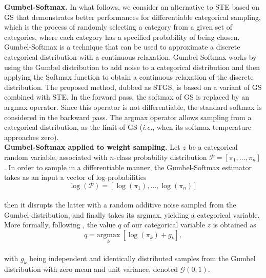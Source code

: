 \noindent\textbf{Gumbel-Softmax.} In what follows, we consider an alternative to
\ac{STE} based on \acf{GS} \cite{DBLP:conf/iclr/JangGP17} that demonstrates
better performances for differentiable categorical sampling, which is the
process of randomly selecting a category from a given set of categories, where
each category has a specified probability of being chosen. Gumbel-Softmax is a
technique that can be used to approximate a discrete categorical distribution
with a continuous relaxation. Gumbel-Softmax works by using the Gumbel
distribution \cite{gumbel1935valeurs} to add noise to a categorical distribution
and then applying the Softmax function to obtain a continuous relaxation of the
discrete distribution. The proposed method, dubbed as \acf{STGS}, is based on a
variant of \acl{GS} combined with \acl{STE}. In the forward pass, the softmax of
\ac{GS} is replaced by an argmax operator. Since this operator is not
differentiable, the standard softmax is considered in the backward pass. The
argmax operator allows sampling from a categorical distribution, as the limit of
\ac{GS} (\emph{i.e.}, when its softmax temperature approaches zero). \\

\noindent \textbf{Gumbel-Softmax applied to weight sampling.} Let $z$ be a
categorical random variable, associated with $n$-class probability distribution
$\mathcal{P} = [\pi_1,\dots,\pi_n]$. In order to sample in a differentiable
manner, the Gumbel-Softmax estimator takes as an input a vector of
log-probabilities \\

\begin{equation}
  \label{eqn:chap2:gumbel-softmax-input}
  \log(\mathcal{P}) =[\log(\pi_1),\dots, \log(\pi_n)]
\end{equation}\\

then it disrupts the latter with a random additive noise sampled from the Gumbel
distribution, and finally takes its argmax, yielding a categorical
variable. More formally, following \cite{DBLP:conf/iclr/JangGP17}, the value $q$
of our categorical variable $z$ is obtained as \\

\begin{equation}
  \label{eqn:chap2:gumbel-softmax-argmax}
  q = \underset{k}{ \text{argmax}} \ [ \log(\pi_k)+g_k ],
\end{equation}\\

with $g_k$ being independent and identically distributed samples from  the
Gumbel distribution with zero mean and unit variance, denoted
$\mathcal{G}(0,1)$.\\

